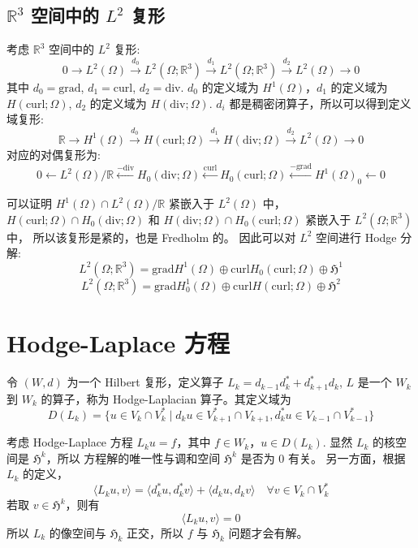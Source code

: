\documentclass[lang=cn,a4paper,newtx]{elegantpaper}
\begin{document}
\subsection{$\mathbb{R}^3$ 空间中的 $L^2$ 复形}
考虑 $\mathbb{R}^3$ 空间中的 $L^2$ 复形:
$$
0 \to L^2(\Omega) \xrightarrow{d_0} L^2(\Omega; \mathbb{R}^3) \xrightarrow{d_1} 
L^2(\Omega; \mathbb{R}^3) \xrightarrow{d_2} L^2(\Omega) \to 0
$$
其中 $d_0 = \mathrm{grad}$, $d_1 = \mathrm{curl}$, $d_2 = \mathrm{div}$.
$d_0$ 的定义域为 $H^1(\Omega)$，$d_1$ 的定义域为 $H(\mathrm{curl}; \Omega)$,
$d_2$ 的定义域为 $H(\mathrm{div}; \Omega)$. 
$d_i$ 都是稠密闭算子，所以可以得到定义域复形:
$$
\mathbb{R} \to H^1(\Omega) \xrightarrow{d_0} H(\mathrm{curl}; \Omega) 
\xrightarrow{d_1} H(\mathrm{div}; \Omega) \xrightarrow{d_2} L^2(\Omega) \to 0
$$
对应的对偶复形为:
$$
0 \leftarrow L^2(\Omega)/\mathbb{R} \xleftarrow{-\mathrm{div}} 
H_0(\mathrm{div}; \Omega) \xleftarrow{\mathrm{curl}}
H_0(\mathrm{curl}; \Omega) \xleftarrow{-\mathrm{grad}} H^1(\Omega)_0 \leftarrow 0
$$

可以证明 $H^1(\Omega) \cap L^2(\Omega)/\mathbb{R}$ 紧嵌入于 $L^2(\Omega)$ 中，
$H(\mathrm{curl}; \Omega) \cap H_0(\mathrm{div}; \Omega)$ 和 
$H(\mathrm{div}; \Omega) \cap H_0(\mathrm{curl}; \Omega)$ 
紧嵌入于 $L^2(\Omega; \mathbb{R}^3)$ 中，
所以该复形是紧的，也是 Fredholm 的。
因此可以对 $L^2$ 空间进行 Hodge 分解:
$$
L^2(\Omega; \mathbb{R}^3) = \mathrm{grad} H^1(\Omega) \oplus \mathrm{curl}
H_0(\mathrm{curl}; \Omega) \oplus \mathfrak{H}^1
$$
$$
L^2(\Omega; \mathbb{R}^3) = \mathrm{grad} H^1_0(\Omega)\oplus \mathrm{curl}
H(\mathrm{curl}; \Omega) \oplus \mathfrak{H}^2
$$

\section{Hodge-Laplace 方程}
令 $(W, d)$ 为一个 Hilbert 复形，定义算子 
$L_k = d_{k-1} d_{k}^* + d_{k+1}^* d_{k}$, $L$ 是一个 $W_k$ 到 $W_k$
的算子，称为 Hodge-Laplacian 算子。其定义域为 
$$
D(L_k) = \{u\in V_k\cap V_k^* \mid d_{k} u \in V_{k+1}^* \cap V_{k+1}
, d_{k}^* u \in V_{k-1}\cap V_{k-1}^*\} 
$$

考虑 Hodge-Laplace 方程 $L_k u = f$，其中 $f \in W_k$，$u \in D(L_k)$.
显然 $L_k$ 的核空间是 $\mathfrak{H}^k$，所以
方程解的唯一性与调和空间 $\mathfrak{H}^k$ 是否为 0 有关。
另一方面，根据 $L_k$ 的定义，
$$
\langle L_k u,  v\rangle = \langle d_{k}^* u, d_{k}^* v\rangle + \langle
d_{k} u, d_k v\rangle \quad \forall v \in V_k\cap V_k^*
$$
若取 $v \in \mathfrak{H}^k$，则有
$$
\langle L_k u, v\rangle = 0
$$
所以 $L_k$ 的像空间与 $\mathfrak{H}_k$ 正交，所以 $f$ 与 $\mathfrak{H}_k$ 
问题才会有解。
\end{document}
